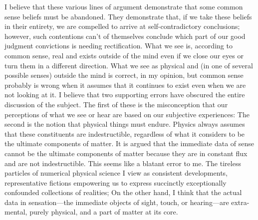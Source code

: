 \documentclass[a4paper,12pt]{book}[2004/02/16]
\theoremstyle{ilemma}
\theoremstyle{itheorem}
\theoremstyle{iother}
\theoremstyle{icorollary}
\theoremstyle{numcorollary}
\theoremstyle{idefinition}
\begin{document}
I believe that these various lines of argument demonstrate that some common sense beliefs must be abandoned. They demonstrate that, if we take these beliefs in their entirety, we are compelled to arrive at self-contradictory conclusions; however, such contentions can't of themselves
conclude which part of our good judgment convictions is needing
rectification. What we see is, according to common sense, real and exists outside of the mind even if we close our eyes or turn them in a different direction. What we see as physical and (in one of several possible senses) outside the mind is correct, in my opinion, but common sense probably is wrong when it assumes that it continues to exist even when we are not looking at it. I believe that two supporting errors have obscured the entire discussion of the subject. The first of these is the misconception that our perceptions of what we see or hear are based on our subjective experiences: The second is the notion that physical things must endure.
Physics always assumes that these constituents are indestructible, regardless of what it considers to be the ultimate components of matter. It is argued that the immediate data of sense cannot be the ultimate components of matter because they are in constant flux and are not indestructible. This seems like a blatant error to me. The tireless particles of numerical physical science I
view as consistent developments, representative fictions empowering us to
express succinctly exceptionally confounded collections of realities; On the other hand, I think that the actual data in sensation—the immediate objects of sight, touch, or hearing—are extra-mental, purely physical, and a part of matter at its core.
\end{document}
